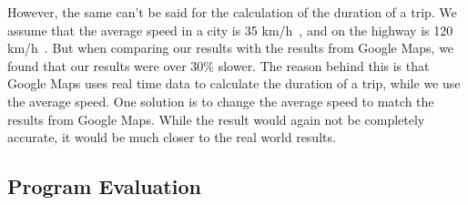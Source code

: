However, the same can't be said for the calculation of the duration of a trip.
We assume that the average speed in a city is 35 km/h~\cite{time_city}, and on the highway is 120
km/h~\cite{time_highway}.
But when comparing our results with the results from Google Maps, we found that our results were over 30\% slower.
The reason behind this is that Google Maps uses real time data to calculate the duration of a trip, while we use the
average speed.
One solution is to change the average speed to match the results from Google Maps.
While the result would again not be completely accurate, it would be much closer to the real world results.

\subsection{Program Evaluation}\label{subsec:program-evaluation}

